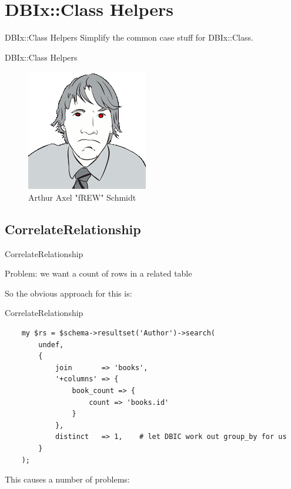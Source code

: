 \section{DBIx::Class Helpers}

\begin{frame}{DBIx::Class Helpers}
Simplify the common case stuff for DBIx::Class.
\end{frame}

\begin{frame}{DBIx::Class Helpers}
\begin{figure}[!ht]
\centering
\includegraphics[width=0.4\linewidth]{img/frew.png}
\caption{Arthur Axel "fREW" Schmidt}
\end{figure}
\end{frame}

\subsection{CorrelateRelationship}

\begin{frame}{CorrelateRelationship}

Problem: we want a count of rows in a related table

\end{frame}

So the obvious approach for this is:

\begin{frame}[fragile]{CorrelateRelationship}
\begin{lstlisting}
    my $rs = $schema->resultset('Author')->search(
        undef,
        {
            join       => 'books',
            '+columns' => {
                book_count => {
                    count => 'books.id'
                }
            },
            distinct   => 1,    # let DBIC work out group_by for us
        }
    );
\end{lstlisting}
\end{frame}
This causes a number of problems:

